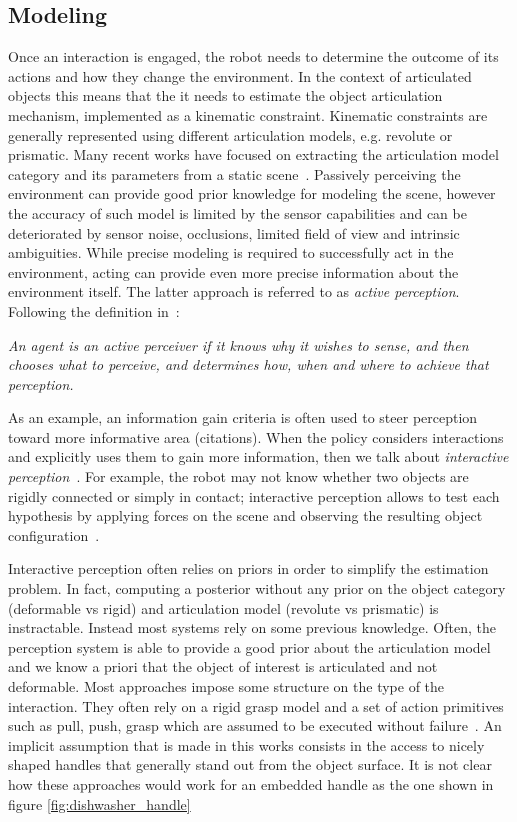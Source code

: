 \subsection{Modeling}
Once an interaction is engaged, the robot needs to determine the outcome of its actions and how they change the environment. In the context of articulated objects this means that the it needs to estimate the object articulation mechanism, implemented as a kinematic constraint. Kinematic constraints are generally represented using different articulation models, e.g. revolute or prismatic. Many recent works have focused on extracting the articulation model category and its parameters from a static scene~\cite{abbatematteo2019learning, li2020category}. 
Passively perceiving the environment can provide good prior knowledge for modeling the scene, however the accuracy of such model is limited by the sensor capabilities and can be deteriorated by sensor noise, occlusions, limited field of view and intrinsic ambiguities. While precise modeling is required to successfully act in the environment, acting can provide even more precise information about the environment itself. The latter approach is referred to as \emph{active perception}. Following the definition in~\cite{bajcsy2018revisiting}:
\begin{displayquote}
\emph{An agent is an active perceiver if it knows why it wishes to sense, and then chooses what to perceive, and determines how, when and where to achieve that perception.}
\end{displayquote}  
As an example, an information gain criteria is often used to steer perception toward more informative area (citations). When the policy considers interactions and explicitly uses them to gain more information, then we talk about \emph{interactive perception}~\cite{bohg2017interactive, katz2014interactive}. For example, the robot may not know whether two objects are rigidly connected or simply in contact; interactive perception allows to test each hypothesis by applying forces on the scene and observing the resulting object configuration~\citep{kroemer2019review}. 

Interactive perception often relies on priors in order to simplify the estimation problem. In fact, computing a posterior without any prior on the object category (deformable vs rigid) and articulation model (revolute vs prismatic) is instractable. Instead most systems rely on some previous knowledge. Often, the perception system is able to provide a good prior about the articulation model~\cite{katz2011interactive} and we know a priori that the object of interest is articulated and not deformable. Most approaches impose some structure on the type of the interaction. They often rely on a rigid grasp model \cite{karayiannidis2013model} and a set of action primitives such as pull, push, grasp which are assumed to be executed without failure~\cite{hausman2015active}. An implicit assumption that is made in this works consists in the access to nicely shaped handles that generally stand out from the object surface. It is not clear how these approaches would work for an embedded handle as the one shown in figure \ref{fig:dishwasher_handle}

